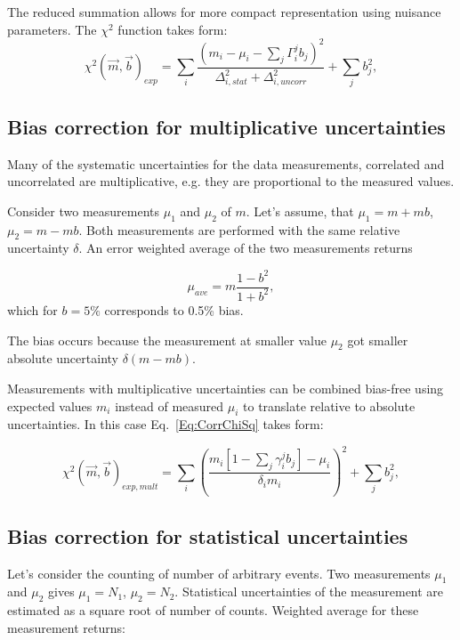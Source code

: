 The reduced summation allows for more compact representation using nuisance parameters. The 
$\chi^2$ function takes form:
\begin{equation}
  \chi^2(\vec{m},\vec{b})_{exp} = \sum_{i} \frac{(m_i-\mu_i-\sum_j \Gamma_i^j b_j)^2}{\Delta_{i, stat}^2 + \Delta_{i, uncorr}^2} + \sum_{j}
  b_j^2,
  \label{Eq:CorrChiSq2}
\end{equation}


\subsection{Bias correction for multiplicative uncertainties}
\label{Sec:MultBias}
Many of the systematic uncertainties for the data measurements, correlated and uncorrelated are multiplicative, e.g. they are proportional to the measured values.

Consider two measurements $\mu_1$ and $\mu_2$ of $m$. Let's assume, that $\mu_1 = m + mb$, $\mu_2 = m-mb$. Both measurements are performed with the same relative uncertainty $\delta$. An error weighted average of the two measurements returns

\begin{equation}
  \mu_{ave} = m \frac{1-b^2}{1+b^2},
  \label{Eq:ErrorAverage}
\end{equation}
which for $b=5\%$ corresponds to 0.5\% bias.

The bias occurs because the measurement at smaller value $\mu_2$ got smaller absolute uncertainty $\delta(m-mb)$.

Measurements with multiplicative uncertainties can be combined bias-free using
expected values $m_i$ instead of measured $\mu_i$ to translate relative to absolute uncertainties. In this case Eq.~\ref{Eq:CorrChiSq} takes form:

\begin{equation}
  \chi^2(\vec{m},\vec{b})_{exp,mult} = \sum_{i} \left(\frac{m_i[1-\sum_j \gamma_i^jb_j]  - \mu_i}{\delta_{i}m_i}\right)^2 + \sum_{j}  b_j^2,
  \label{Eq:StatCorrChiSq2a}
\end{equation}

\subsection{Bias correction for statistical uncertainties}
\label{Sec:StatBias}
Let's consider the counting of number of arbitrary events. Two measurements $\mu_1$ and $\mu_2$ gives $\mu_1 = N_1$, $\mu_2 = N_2$. Statistical uncertainties of the measurement are estimated as a square root of number of counts. Weighted average for these measurement returns:

